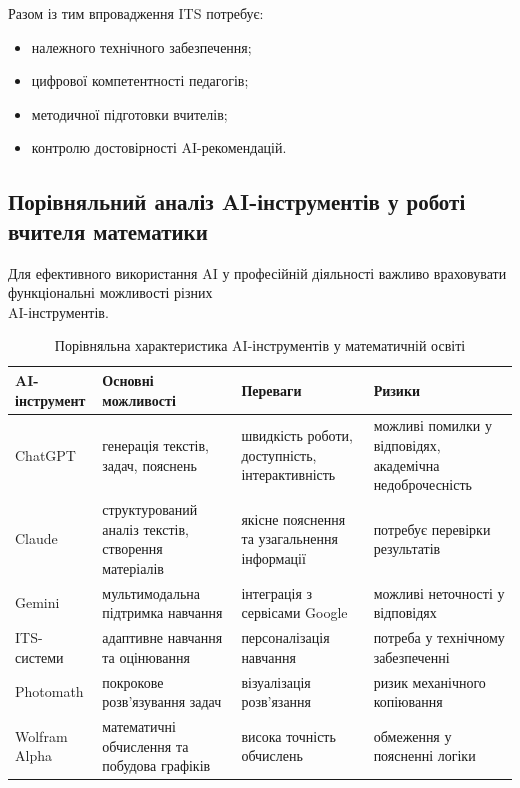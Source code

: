 Разом із тим впровадження ITS потребує:
\begin{itemize}
\item належного технічного забезпечення;
\item цифрової компетентності педагогів;
\item методичної підготовки вчителів;
\item контролю достовірності AI-рекомендацій.
\end{itemize}

\subsection{Порівняльний аналіз AI-інструментів у роботі вчителя математики}

Для ефективного використання AI у професійній діяльності важливо враховувати функціональні можливості різних\\
AI-інструментів.

\begin{table}[H]
\centering
\caption{Порівняльна характеристика AI-інструментів у математичній освіті}
\label{tab:ai_tools}

\renewcommand{\arraystretch}{1.3}

\begin{tabular}{|p{2.8cm}|p{3.8cm}|p{3.8cm}|p{3.8cm}|}
\hline

\textbf{AI-інструмент} &
\textbf{Основні можливості} &
\textbf{Переваги} &
\textbf{Ризики} \\

\hline

ChatGPT &
генерація текстів, задач, пояснень &
швидкість роботи, доступність, інтерактивність &
можливі помилки у відповідях, академічна недоброчесність \\

\hline

Claude &
структурований аналіз текстів, створення матеріалів &
якісне пояснення та узагальнення інформації &
потребує перевірки результатів \\

\hline

Gemini &
мультимодальна підтримка навчання &
інтеграція з сервісами Google &
можливі неточності у відповідях \\

\hline

ITS-системи &
адаптивне навчання та оцінювання &
персоналізація навчання &
потреба у технічному забезпеченні \\

\hline

Photomath &
покрокове розв’язування задач &
візуалізація розв’язання &
ризик механічного копіювання \\

\hline

Wolfram Alpha &
математичні обчислення та побудова графіків &
висока точність обчислень &
обмеження у поясненні логіки \\

\hline

\end{tabular}
\end{table}

